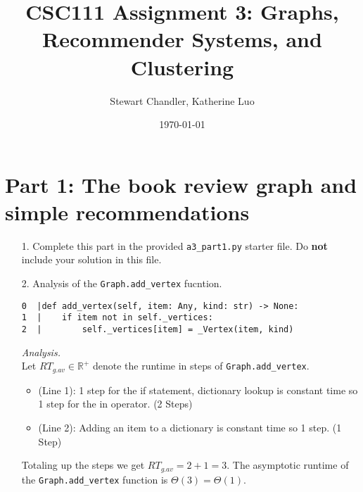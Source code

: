 \documentclass[11pt]{article}
\title{CSC111 Assignment 3: Graphs, Recommender Systems, and Clustering}
\author{Stewart Chandler, Katherine Luo}
\date{\today}
\begin{document}
\maketitle

\section*{Part 1: The book review graph and simple recommendations}

\begin{enumerate}

\item[1.]
Complete this part in the provided \texttt{a3\_part1.py} starter file.
Do \textbf{not} include your solution in this file.

\item[2.]
Analysis of the \texttt{Graph.add\_vertex} fucntion.
\begin{verbatim}
0  |def add_vertex(self, item: Any, kind: str) -> None:
1  |    if item not in self._vertices:
2  |        self._vertices[item] = _Vertex(item, kind)
\end{verbatim}
\textit{Analysis.}\\
Let $RT_{g.av} \in \mathbb{R}^+$ denote the runtime in steps of \texttt{Graph.add\_vertex}. 
\begin{itemize}
    \item (Line 1): 1 step for the if statement, dictionary lookup is constant time so 1 step for the in operator. (2 Steps)
    \item (Line 2): Adding an item to a dictionary is constant time so 1 step. (1 Step)
\end{itemize}
Totaling up the steps we get $RT_{g.av} = 2 + 1 = 3$.  The asymptotic runtime of the \texttt{Graph.add\_vertex} 
function is $\Theta(3) = \Theta(1)$.


\end{enumerate}
\end{document}

